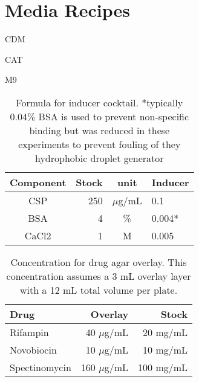 
\chapter{Media Recipes} %

\label{AppendixA} %


CDM

CAT

M9

\begin{table}[]
	\centering
	\caption{Formula for inducer cocktail. *typically 0.04\% BSA is used to prevent non-specific binding but was reduced in these experiments to prevent fouling of they hydrophobic droplet generator}
	\label{table_csp}
	\begin{tabular}{crcl}
		\hline
		Component & Stock & unit  & Inducer \\ \hline
		CSP       & 250   & $\mu$g/mL & 0.1     \\
		BSA       & 4     & \%    & 0.004*  \\
		CaCl2     & 1     & M     & 0.005   \\
	\end{tabular}
\end{table}

\begin{table}[]
	\centering
	\caption{Concentration for drug agar overlay. This concentration assumes a 3 mL overlay layer with a 12 mL total volume per plate.}
	\label{table_drug-agar}
	\begin{tabular}{lrr}
		\hline
		Drug          & Overlay   & Stock     \\ \hline
		Rifampin      & 40 $\mu$g/mL  & 20 mg/mL  \\
		Novobiocin    & 10 $\mu$g/mL  & 10 mg/mL  \\
		Spectinomycin & 160 $\mu$g/mL & 100 mg/mL
	\end{tabular}
\end{table}